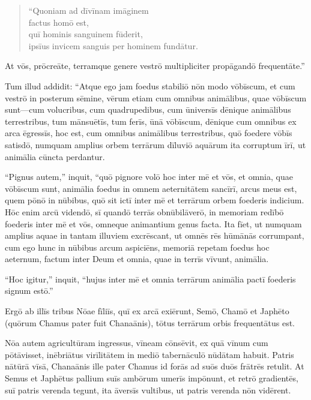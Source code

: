 \begin{verse}
\begin{patverse*}
``Quoniam ad dīvīnam imāginem\\
factus homō est,\\
quī hominis sanguinem fūderit,\\
ipsīus invicem sanguis per hominem fundātur.
\end{patverse*}
\end{verse}
\Versus At vōs, prōcreāte, terramque genere vestrō multipliciter propāgandō frequentāte.''

\Versus Tum illud addidit:
\Versus ``Atque ego jam foedus stabiliō nōn modo vōbīscum, et cum vestrō in posterum sēmine,
\Versus vērum etiam cum omnibus animālibus, quae vōbīscum sunt—cum volucribus, cum quadrupedibus, cum ūniversīs dēnique animālibus terrestribus, tum mānsuētīs, tum ferīs, ūnā vōbīscum, dēnique cum omnibus ex arca ēgressīs, hoc est, cum omnibus animālibus terrestribus,
\Versus quō foedere vōbīs  satisdō, numquam amplius orbem terrārum dīluviō aquārum ita corruptum īrī, ut animālia cūncta perdantur.

\Versus ``Pignus autem,'' inquit, ``quō pignore volō hoc inter mē et vōs, et omnia, quae vōbīscum sunt, animālia foedus in omnem aeternitātem sancīrī,
\Versus arcus meus est, quem pōnō in nūbibus, quō sit ictī inter mē et terrārum orbem foederis indicium.
\Versus Hōc enim arcū videndō, sī quandō terrās obnūbilāverō,
\Versus in memoriam redībō foederis inter mē et vōs, omneque animantium genus facta.
\Versus Ita fīet, ut numquam amplius aquae in tantam illuviem excrēscant, ut omnēs rēs hūmānās corrumpant, cum ego hunc in nūbibus arcum aspiciēns, memoriā repetam foedus hoc aeternum, factum inter Deum et omnia, quae in terrīs vīvunt, animālia.

\Versus ``Hoc igitur,'' inquit, ``hujus inter mē et omnia terrārum animālia pactī foederis signum estō.''

\Versus Ergō ab illīs tribus Nōae fīliīs, quī ex arcā exiērunt, Semō, Chamō et Japhēto (quōrum Chamus pater fuit Chanaānis),
\Versus tōtus terrārum orbis frequentātus est.

\Versus Nōa autem agricultūram ingressus, vīneam cōnsēvit,
\Versus ex quā vīnum cum pōtāvisset, inēbriātus virīlitātem in mediō tabernāculō nūdātam habuit.
\Versus Patris nātūrā vīsā, Chanaānis ille pater Chamus id forās ad suōs duōs frātrēs retulit.
\Versus At Semus et Japhētus pallium suīs ambōrum umerīs impōnunt, et retrō gradientēs, suī patris verenda tegunt, ita āversīs vultibus, ut patris verenda nōn vidērent.

